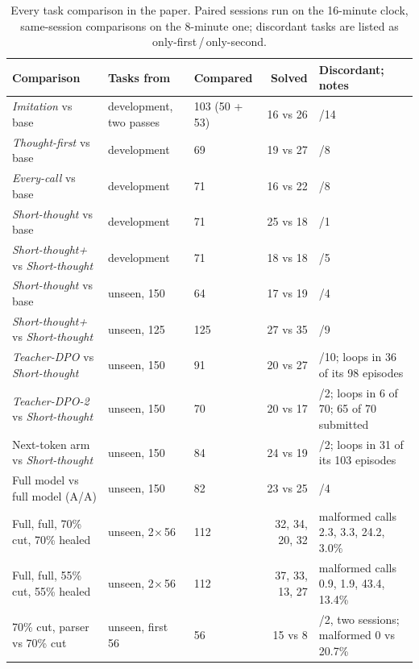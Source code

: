 \documentclass[10pt,twocolumn]{article}
\newcommand{\X}{\ensuremath{\times}}
\newcommand{\ad}[1]{\textit{#1}}   %
\begin{document}
\begin{table}[t]
  \caption{Every task comparison in the paper. Paired sessions run on the 16-minute clock, same-session comparisons on
  the 8-minute one; discordant tasks are listed as only-first\,/\,only-second.}
  \label{tab:sets}
  \small
  \setlength{\tabcolsep}{4pt}
  \begin{tabularx}{\textwidth}{@{}lllr>{\raggedright\arraybackslash}X@{}}
    \toprule
    Comparison & Tasks from & Compared & Solved & Discordant; notes \\
    \midrule
    \ad{Imitation} vs base & development, two passes & 103 (50 + 53) & 16 vs 26 & 4/14 \\
    \ad{Thought-first} vs base & development & 69 & 19 vs 27 & 0/8 \\
    \ad{Every-call} vs base & development & 71 & 16 vs 22 & 2/8 \\
    \ad{Short-thought} vs base & development & 71 & 25 vs 18 & 8/1 \\
    \ad{Short-thought+} vs \ad{Short-thought} & development & 71 & 18 vs 18 & 5/5 \\
    \ad{Short-thought} vs base & unseen, 150 & 64 & 17 vs 19 & 2/4 \\
    \ad{Short-thought+} vs \ad{Short-thought} & unseen, 125 & 125 & 27 vs 35 & 1/9 \\
    \ad{Teacher-DPO} vs \ad{Short-thought} & unseen, 150 & 91 & 20 vs 27 & 3/10; loops in 36 of its 98 episodes \\
    \ad{Teacher-DPO-2} vs \ad{Short-thought} & unseen, 150 & 70 & 20 vs 17 & 5/2; loops in 6 of 70; 65 of 70 submitted \\
    Next-token arm vs \ad{Short-thought} & unseen, 150 & 84 & 24 vs 19 & 7/2; loops in 31 of its 103 episodes \\
    Full model vs full model (A/A) & unseen, 150 & 82 & 23 vs 25 & 2/4 \\
    \midrule
    Full, full, 70\% cut, 70\% healed & unseen, 2\X\,56 & 112 & 32, 34, 20, 32 & malformed calls 2.3, 3.3, 24.2, 3.0\% \\
    Full, full, 55\% cut, 55\% healed & unseen, 2\X\,56 & 112 & 37, 33, 13, 27 & malformed calls 0.9, 1.9, 43.4, 13.4\% \\
    70\% cut, parser vs 70\% cut & unseen, first 56 & 56 & 15 vs 8 & 9/2, two sessions; malformed 0 vs 20.7\% \\
    \bottomrule
  \end{tabularx}
\end{table}
\end{document}
